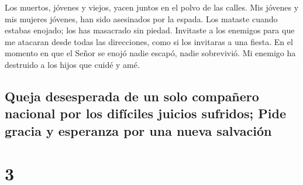  Los muertos, jóvenes y viejos, yacen juntos en el polvo
de las calles. Mis jóvenes y mis mujeres jóvenes, han sido asesinados
por la espada. Los mataste cuando estabas enojado; los has masacrado sin
piedad.  Invitaste a los enemigos para que me atacaran
desde todas las direcciones, como si los invitaras a una fiesta. En el
momento en que el Señor se enojó nadie escapó, nadie sobrevivió. Mi
enemigo ha destruido a los hijos que cuidé y amé.

\hypertarget{queja-desesperada-de-un-solo-compauxf1ero-nacional-por-los-difuxedciles-juicios-sufridos-pide-gracia-y-esperanza-por-una-nueva-salvaciuxf3n}{%
\subsection{Queja desesperada de un solo compañero nacional por los
difíciles juicios sufridos; Pide gracia y esperanza por una nueva
salvación}\label{queja-desesperada-de-un-solo-compauxf1ero-nacional-por-los-difuxedciles-juicios-sufridos-pide-gracia-y-esperanza-por-una-nueva-salvaciuxf3n}}

\hypertarget{section-2}{%
\section{3}\label{section-2}}

